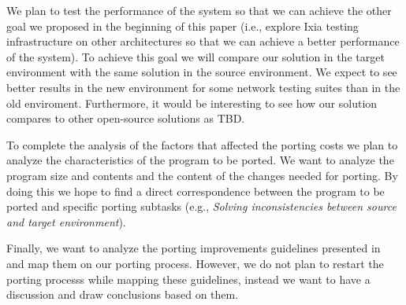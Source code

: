 We plan to test the performance of the system so that we can achieve the other
goal we proposed in the beginning of this paper (i.e., explore Ixia testing
infrastructure on other architectures so that we can achieve a better
performance of the system). To achieve this goal we will compare our solution in
the target environment with the same solution in the source environment. We
expect to see better results in the new environment for some network testing
suites than in the old enviroment. Furthermore, it would be interesting to see
how our solution compares to other open-source solutions as {\color{red} TBD}.

To complete the analysis of the factors that affected the porting costs we plan
to analyze the characteristics of the program to be ported. We want to analyze
the program size and contents and the content of the changes needed for porting.
By doing this we hope to find a direct correspondence between the program to be
ported and specific porting subtasks (e.g., \textit{Solving inconsistencies
between source and target environment}).

Finally, we want to analyze the porting improvements guidelines presented
in~\cite{b1} and map them on our porting process. However, we do not plan to
restart the porting processs while mapping these guidelines, instead we want to
have a discussion and draw conclusions based on them.
